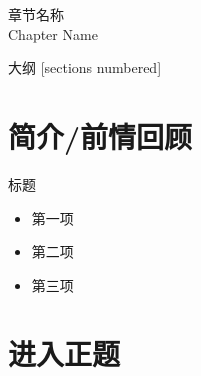 \documentclass{styles/cuzbeamer}
\begin{document}
    
    \maketitle

    \begin{standout}[第X章]
        章节名称\\
        Chapter Name
    \end{standout}

    \begin{frame}{大纲}
        [sections numbered]
        \tableofcontents
    \end{frame}

    \section{简介/前情回顾}

    \begin{frame}
        \begin{block}{标题}
            \begin{itemize}
                \item 第一项
                \item 第二项
                \item 第三项
            \end{itemize}
        \end{block}
    \end{frame}

    \section{进入正题}
\end{document}
